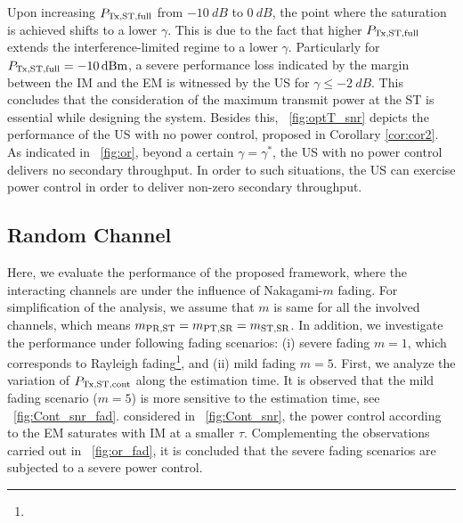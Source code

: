   Upon increasing $P_{\text{Tx,ST,full}}$ from $\SI{-10}{dB}$ to $\SI{0}{dB}$, the point where the saturation is achieved shifts to a lower $\gamma$. This is due to the fact that higher $P_{\text{Tx,ST,full}}$ extends the interference-limited regime to a lower $\gamma$.  Particularly for $P_{\text{Tx,ST,full}} = \SI{-10}{dBm}$, a severe performance loss indicated by the margin between the IM and the EM is witnessed by the US for $\gamma \le \SI{-2}{dB}$. This concludes that the consideration of the maximum transmit power at the ST is essential while designing the system. Besides this, \figurename~\ref{fig:optT_snr} depicts the performance of the US with no power control, proposed in Corollary \ref{cor:cor2}. As indicated in \figurename~\ref{fig:or}, beyond a certain $\gamma = \gamma^*$, the US with no power control delivers no secondary throughput. In order to  such situations, the US can exercise power control in order to deliver non-zero secondary throughput. 
\subsection{Random Channel} 
Here, we evaluate the performance of the proposed framework, where the interacting channels are under the influence of Nakagami-$m$ fading. For simplification of the analysis, we assume that $m$ is same for all the involved channels, which means $m_{\text{PR,ST}} = m_{\text{PT,SR}} = m_{\text{ST,SR}}$. In addition, we investigate the performance under following fading scenarios: (i) severe fading $m=1$, which corresponds to Rayleigh fading\footnote{}, and (ii) mild fading $m = 5$. First, we analyze the variation of $P_{\text{Tx,ST,cont}}$ along the estimation time. It is observed that the mild fading scenario ($m = 5$) is more sensitive to the estimation time, see \figurename~\ref{fig:Cont_snr_fad}.  considered in \figurename~\ref{fig:Cont_snr}, the power control according to the EM saturates with IM at a smaller $\tau$. Complementing the observations carried out in \figurename~\ref{fig:or_fad}, it is concluded that the severe fading scenarios are subjected to a severe power control. 

